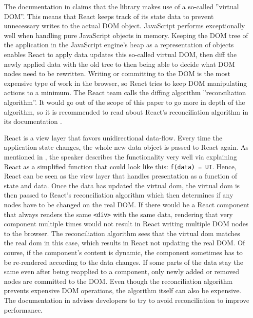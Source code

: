 The documentation in \cite[/docs]{React} claims that the library makes use of a so-called ''virtual DOM''. This means that React keeps track of its state data to prevent unnecessary writes to the actual DOM object. JavaScript performs exceptionally well when handling pure JavaScript objects in memory. Keeping the DOM tree of the application in the JavaScript engine's heap as a representation of objects enables React to apply data updates this so-called virtual DOM, then diff the newly applied data with the old tree to then being able to decide what DOM nodes need to be rewritten. Writing or committing to the DOM is the most expensive type of work in the browser, so React tries to keep DOM manipulating actions to a minimum. The React team calls the diffing algorithm ''reconciliation algorithm''. It would go out of the scope of this paper to go more in depth of the algorithm, so it is recommended to read about React's reconciliation algorithm in its documentation \cite[/docs]{React}.

React is a view layer that favors unidirectional data-flow. Every time the application state changes, the whole new data object is passed to React again. As mentioned in \cite[6:50]{ReactFoundingVideo}, the speaker describes the functionality very well via explaining React as a simplified function that could look like this: \texttt{f(data) = UI}. Hence, React can be seen as the view layer that handles presentation as a function of state and data. Once the data has updated the virtual dom, the virtual dom is then passed to React's reconciliation algorithm which then determines if any nodes have to be changed on the real DOM. If there would be a React component that always renders the same \texttt{<div>} with the same data, rendering that very component multiple times would not result in React writing multiple DOM nodes to the browser. The reconciliation algorithm sees that the virtual dom matches the real dom in this case, which results in React not updating the real DOM. Of course, if the component's content is dynamic, the component sometimes has to be re-rendered according to the data changes. If some parts of the data stay the same even after being reapplied to a component, only newly added or removed nodes are committed to the DOM. Even though the reconciliation algorithm prevents expensive DOM operations, the algorithm itself can also be expensive. The documentation in \cite[/docs/optimizing-performance.html\#avoid-reconciliation]{React} advises developers to try to avoid reconciliation to improve performance.

